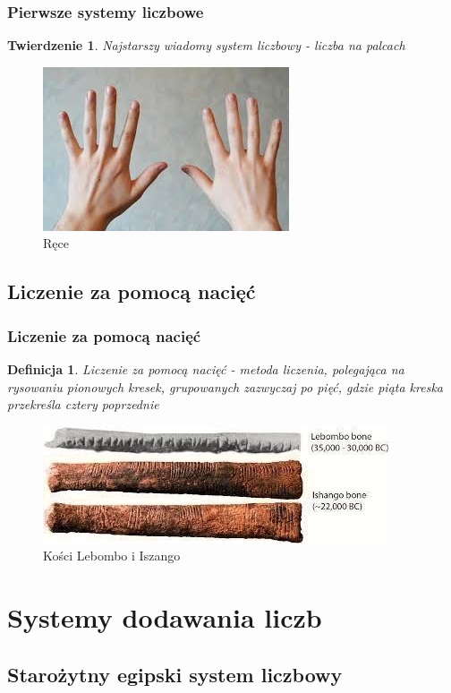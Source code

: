 \documentclass[12pt]{beamer}
\theoremstyle{plain}
\newtheorem{thm}{Twierdzenie}
\newtheorem{defi}{Definicja}
\begin{document}
\begin{frame}
\frametitle{Pierwsze systemy liczbowe}
\pause
\begin{thm}
Najstarszy wiadomy system liczbowy \pause - liczba na palcach
\end{thm} 
\begin{figure}
    \centering
    \includegraphics[width=0.5\linewidth]{Hands.jpg}
    \caption{Ręce \cite{ręce}}
    \label{fig:placeholder}
\end{figure}
\end{frame}

\subsection{Liczenie za pomocą nacięć}

\begin{frame}
\frametitle{Liczenie za pomocą nacięć}
\pause
\begin{defi}
Liczenie za pomocą nacięć - metoda liczenia, polegająca na rysowaniu pionowych kresek, grupowanych zazwyczaj po pięć, gdzie piąta kreska przekreśla cztery poprzednie
\end{defi} \pause
\begin{figure}
    \centering
    \includegraphics[width=0.8\linewidth]{Kości.jpg}
    \caption{Kości Lebombo i Iszango \cite{kości}}
    \label{fig:placeholder}
\end{figure}
\end{frame}

\section{Systemy dodawania liczb}
\subsection{Starożytny egipski system liczbowy}
\end{document}
